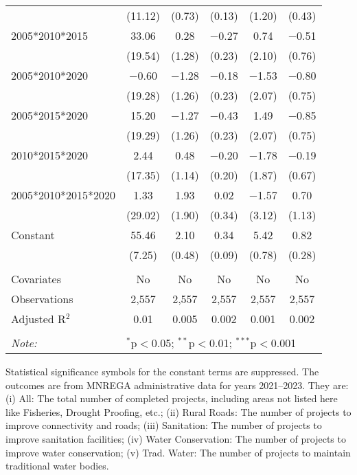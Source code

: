 \begin{table}[!htbp]
\begin{threeparttable}
\begin{tabular}{@{\extracolsep{0pt}}lccccc}
  & (11.12) & (0.73) & (0.13) & (1.20) & (0.43) \\ 
  2005*2010*2015 & 33.06 & 0.28 & $-$0.27 & 0.74 & $-$0.51 \\ 
  & (19.54) & (1.28) & (0.23) & (2.10) & (0.76) \\ 
  2005*2010*2020 & $-$0.60 & $-$1.28 & $-$0.18 & $-$1.53 & $-$0.80 \\ 
  & (19.28) & (1.26) & (0.23) & (2.07) & (0.75) \\ 
  2005*2015*2020 & 15.20 & $-$1.27 & $-$0.43 & 1.49 & $-$0.85 \\ 
  & (19.29) & (1.26) & (0.23) & (2.07) & (0.75) \\ 
  2010*2015*2020 & 2.44 & 0.48 & $-$0.20 & $-$1.78 & $-$0.19 \\ 
  & (17.35) & (1.14) & (0.20) & (1.87) & (0.67) \\ 
  2005*2010*2015*2020 & 1.33 & 1.93 & 0.02 & $-$1.57 & 0.70 \\ 
  & (29.02) & (1.90) & (0.34) & (3.12) & (1.13) \\ 
  Constant & 55.46 & 2.10 & 0.34 & 5.42 & 0.82 \\ 
  & (7.25) & (0.48) & (0.09) & (0.78) & (0.28) \\ 
 \hline \\[-1.8ex] 
Covariates & No & No & No & No & No \\ 
Observations & 2,557 & 2,557 & 2,557 & 2,557 & 2,557 \\ 
Adjusted R$^{2}$ & 0.01 & 0.005 & 0.002 & 0.001 & 0.002 \\ 
\hline 
\hline \\[-1.8ex] 
\textit{Note:}  & \multicolumn{5}{l}{$^{*}$p$<$0.05; $^{**}$p$<$0.01; $^{***}$p$<$0.001} \\ 
\end{tabular} 
\begin{tablenotes}[flushleft]
\scriptsize
\item[] Statistical significance symbols for the constant terms are suppressed. The outcomes are from MNREGA administrative data for years 2021--2023. They are: 
(i) All: The total number of completed projects, including areas not listed here like Fisheries, Drought Proofing, etc.;
(ii) Rural Roads: The number of projects to improve connectivity and roads;
(iii) Sanitation: The number of projects to improve sanitation facilities;
(iv) Water Conservation: The number of projects to improve water conservation;
(v) Trad. Water: The number of projects to maintain traditional water bodies.
\end{tablenotes}
\end{threeparttable}
\end{table}
